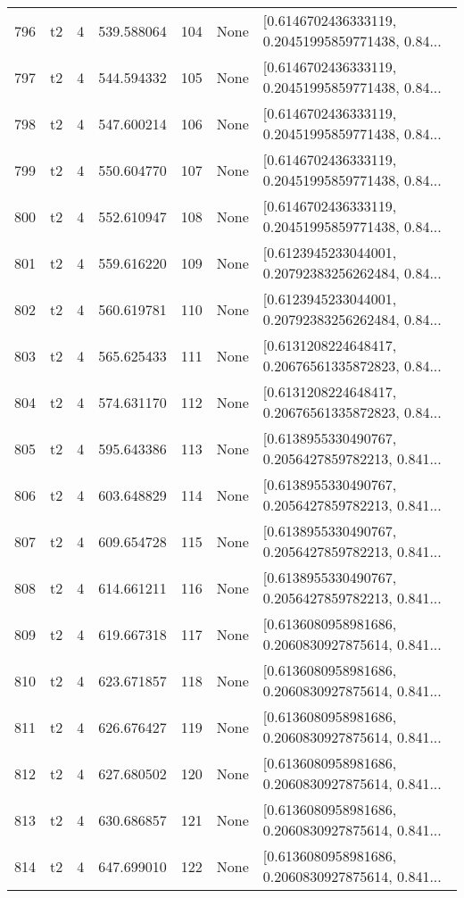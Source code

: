 \begin{tabular}{lllrlll}
796 &  t2 &   4 &   539.588064 &  104 &  None &  [0.6146702436333119, 0.20451995859771438, 0.84... \\
797 &  t2 &   4 &   544.594332 &  105 &  None &  [0.6146702436333119, 0.20451995859771438, 0.84... \\
798 &  t2 &   4 &   547.600214 &  106 &  None &  [0.6146702436333119, 0.20451995859771438, 0.84... \\
799 &  t2 &   4 &   550.604770 &  107 &  None &  [0.6146702436333119, 0.20451995859771438, 0.84... \\
800 &  t2 &   4 &   552.610947 &  108 &  None &  [0.6146702436333119, 0.20451995859771438, 0.84... \\
801 &  t2 &   4 &   559.616220 &  109 &  None &  [0.6123945233044001, 0.20792383256262484, 0.84... \\
802 &  t2 &   4 &   560.619781 &  110 &  None &  [0.6123945233044001, 0.20792383256262484, 0.84... \\
803 &  t2 &   4 &   565.625433 &  111 &  None &  [0.6131208224648417, 0.20676561335872823, 0.84... \\
804 &  t2 &   4 &   574.631170 &  112 &  None &  [0.6131208224648417, 0.20676561335872823, 0.84... \\
805 &  t2 &   4 &   595.643386 &  113 &  None &  [0.6138955330490767, 0.2056427859782213, 0.841... \\
806 &  t2 &   4 &   603.648829 &  114 &  None &  [0.6138955330490767, 0.2056427859782213, 0.841... \\
807 &  t2 &   4 &   609.654728 &  115 &  None &  [0.6138955330490767, 0.2056427859782213, 0.841... \\
808 &  t2 &   4 &   614.661211 &  116 &  None &  [0.6138955330490767, 0.2056427859782213, 0.841... \\
809 &  t2 &   4 &   619.667318 &  117 &  None &  [0.6136080958981686, 0.2060830927875614, 0.841... \\
810 &  t2 &   4 &   623.671857 &  118 &  None &  [0.6136080958981686, 0.2060830927875614, 0.841... \\
811 &  t2 &   4 &   626.676427 &  119 &  None &  [0.6136080958981686, 0.2060830927875614, 0.841... \\
812 &  t2 &   4 &   627.680502 &  120 &  None &  [0.6136080958981686, 0.2060830927875614, 0.841... \\
813 &  t2 &   4 &   630.686857 &  121 &  None &  [0.6136080958981686, 0.2060830927875614, 0.841... \\
814 &  t2 &   4 &   647.699010 &  122 &  None &  [0.6136080958981686, 0.2060830927875614, 0.841... \\

\end{tabular}
